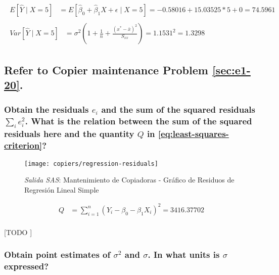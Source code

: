 \documentclass{article}
\begin{document}
        \begin{align}
          \begin{split}
            E\left[\widehat{Y} \mid X = 5\right] &=
            E\left[\widehat{\beta}_0 +\widehat{\beta}_1X + \epsilon \mid X = 5\right]
            = -0.58016 + 15.03525 * 5 + 0 = 74.5961
          \end{split}\\
          \begin{split}
            Var\left[\widehat{Y} \mid X = 5\right] &=
            \sigma^2\left(1 + \frac{1}{n} + \frac{(x^* - \bar{x})^2}{S_{xx}}\right) =
            1.1531 ^ 2 =
            1.3298
          \end{split}
        \end{align}

    \setcounter{subsection}{23}
    \subsection{Refer to \textbf{Copier maintenance} Problem \ref{sec:e1-20}.}

      \subsubsection{Obtain the residuals $e_i$ and the sum of the squared residuals $\sum_i e_i^2$. What is the relation between the sum of the squared residuals here and the quantity $Q$ in \eqref{eq:least-squares-criterion}?}

        \begin{figure}[!h]
          \centering
          \texttt{[image: copiers/regression-residuals]}
          \caption{\emph{Salida SAS}: Mantenimiento de Copiadoras - Gráfico de Residuos de Regresión Lineal Simple}
          \label{img:copiers-regression-residuals}
        \end{figure}

        \begin{align}
        \label{eq:least-squares-criterion}
          Q &= \sum\limits_{i=1}^n(Y_i - \beta_0 - \beta_1X_i)^2 = 3416.37702
        \end{align}


        \paragraph{}
        [TODO ]

      \subsubsection{Obtain point estimates of $\sigma^2$ and $\sigma$. In what units is $\sigma$ expressed?}
\end{document}
